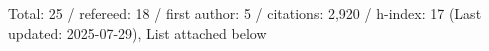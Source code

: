Total: 25 / refereed: 18 / first author: 5 / citations: 2,920 / h-index: 17 (Last updated: 2025-07-29), List attached below